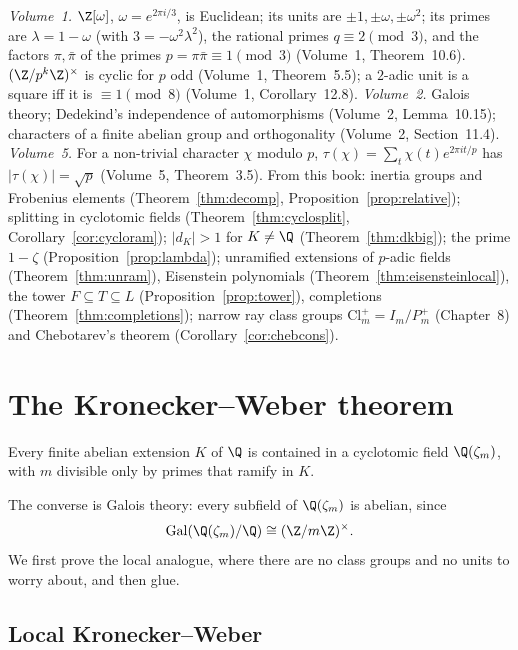\begin{reminder}
\emph{Volume~1.} $\Z[\omega]$, $\omega=e^{2\pi i/3}$, is Euclidean; its units are $\pm1,\pm\omega,\pm\omega^2$; its primes are
$\lambda=1-\omega$ (with $3=-\omega^2\lambda^2$), the rational primes $q\equiv2\pmod3$, and the factors $\pi,\bar\pi$ of the primes
$p=\pi\bar\pi\equiv1\pmod3$ (Volume~1, Theorem~10.6). $(\Z/p^k\Z)^\times$ is cyclic for $p$ odd (Volume~1, Theorem~5.5); a $2$-adic unit is a
square iff it is $\equiv1\pmod8$ (Volume~1, Corollary~12.8). \emph{Volume~2.} Galois theory; Dedekind's independence of automorphisms
(Volume~2, Lemma~10.15); characters of a finite abelian group and orthogonality (Volume~2, Section~11.4). \emph{Volume~5.} For a non-trivial
character $\chi$ modulo $p$, $\tau(\chi)=\sum_t\chi(t)e^{2\pi it/p}$ has $|\tau(\chi)|=\sqrt p$ (Volume~5, Theorem~3.5). From this book:
inertia groups and Frobenius elements (Theorem~\ref{thm:decomp}, Proposition~\ref{prop:relative}); splitting in cyclotomic fields
(Theorem~\ref{thm:cyclosplit}, Corollary~\ref{cor:cycloram}); $|d_K|>1$ for $K\ne\Q$ (Theorem~\ref{thm:dkbig}); the prime $1-\zeta$
(Proposition~\ref{prop:lambda}); unramified extensions of $p$-adic fields (Theorem~\ref{thm:unram}), Eisenstein polynomials
(Theorem~\ref{thm:eisensteinlocal}), the tower $F\subseteq T\subseteq L$ (Proposition~\ref{prop:tower}), completions
(Theorem~\ref{thm:completions}); narrow ray class groups $\mathrm{Cl}_m^+=I_m/P_m^+$ (Chapter~8) and Chebotarev's theorem
(Corollary~\ref{cor:chebcons}).
\end{reminder}

\section{The Kronecker--Weber theorem}

\begin{theorem}\label{thm:kw}
Every finite abelian extension $K$ of $\Q$ is contained in a cyclotomic field $\Q(\zeta_m)$, with $m$ divisible only by primes that
ramify in $K$.
\end{theorem}

The converse is Galois theory: every subfield of $\Q(\zeta_m)$ is abelian, since
\[
\operatorname{Gal}(\Q(\zeta_m)/\Q)\cong(\Z/m\Z)^\times.
\]
We
first prove the local analogue, where there are no class groups and no units to worry about, and then glue.

\subsection*{Local Kronecker--Weber}

